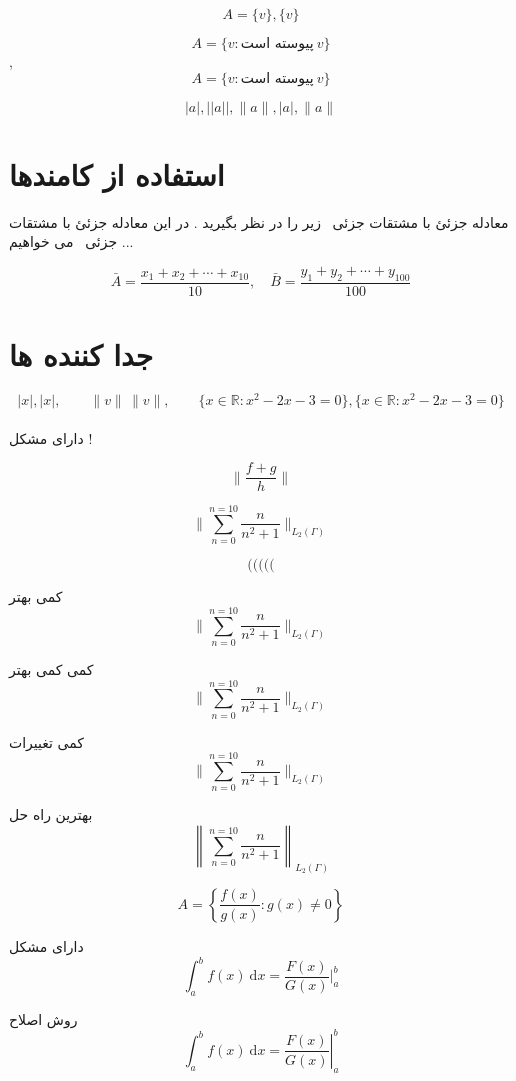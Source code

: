 \documentclass[12pt]{article}
\newcommand{\pde}{معادله جزئئ با مشتقات جزئی \ }
\newcommand{\mian}[2]{\frac{#1_1 + #1_2 + \cdots + #1_{#2}}{#2}}
\begin{document}
\[
A = \lbrace v \rbrace, \{ v \}
\]

\[
A = \lbrace v : \text{پیوسته است} \ v \rbrace
\],\quad 
\[
A = \lbrace v \colon \text{پیوسته است} \ v \rbrace
\]

\[
|a| , ||a||,\| a \| , \lvert a \rvert, \lVert a \rVert
\]

\section{استفاده از کامندها}

\pde زیر را در نظر بگیرید
. در این \pde می خواهیم ...

\[
\bar{A} = \mian{x}{10} , \quad \bar{B} = \mian{y}{100}
\]

\section{جدا کننده ها}

\[
|x|,\lvert x \rvert,\qquad
\|v\|\,\lVert v \lVert,\qquad
\{ x \in \mathbb{R} \colon  x^2 - 2x-3=0 \},\lbrace x \in \mathbb{R}  \colon x^2 -2x-3=0 \rbrace
\]
\\

دارای مشکل !

$$\lVert \frac{f+g}{h} \rVert$$

$$\lVert \sum_{n=0}^{n=10} \frac{n}{n^2+1} \rVert_{L_2(\Gamma)} $$


\[
(\big(\Big(\bigg(\Bigg(
\]

کمی بهتر
\[
\Big\lVert \sum_{n=0}^{n=10} \frac{n}{n^2+1} \Big\rVert_{L_2(\Gamma)} 
\]

کمی کمی بهتر
\[
\bigg\lVert \sum_{n=0}^{n=10} \frac{n}{n^2+1} \bigg\rVert_{L_2(\Gamma)} 
\]

کمی تغییرات
\[
\Bigg\lVert \sum_{n=0}^{n=10} \frac{n}{n^2+1} \Bigg\rVert_{L_2(\Gamma)} 
\]

بهترین راه حل
\[
\left\lVert \sum_{n=0}^{n=10} \frac{n}{n^2+1} \right\rVert_{L_2(\Gamma)} 
\]

\[
A = \left\lbrace \frac{f(x)}{g(x)} \colon g(x) \neq 0 \right\rbrace
\]

دارای مشکل
\[
\int_{a}^{b} f(x) \ \mathrm{d} x = \frac{F(x)}{G(x)}|_{a}^{b}
\]

روش اصلاح
\[
\int_{a}^{b} f(x) \ \mathrm{d}x = \left.\frac{F(x)}{G(x)}\right|_{a}^{b}
\]
\end{document}
